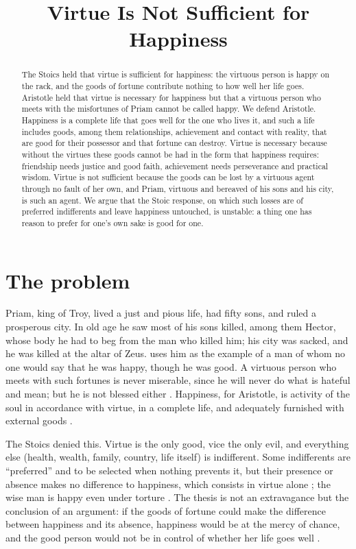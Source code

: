 \documentclass{situationist-preprint}
\title{Virtue Is Not Sufficient for Happiness}
\begin{document}
\maketitle

\begin{abstract}
The Stoics held that virtue is sufficient for happiness: the virtuous person is happy on the rack, and the goods of fortune contribute nothing to how well her life goes. Aristotle held that virtue is necessary for happiness but that a virtuous person who meets with the misfortunes of Priam cannot be called happy. We defend Aristotle. Happiness is a complete life that goes well for the one who lives it, and such a life includes goods, among them relationships, achievement and contact with reality, that are good for their possessor and that fortune can destroy. Virtue is necessary because without the virtues these goods cannot be had in the form that happiness requires: friendship needs justice and good faith, achievement needs perseverance and practical wisdom. Virtue is not sufficient because the goods can be lost by a virtuous agent through no fault of her own, and Priam, virtuous and bereaved of his sons and his city, is such an agent. We argue that the Stoic response, on which such losses are of preferred indifferents and leave happiness untouched, is unstable: a thing one has reason to prefer for one's own sake is good for one.
\end{abstract}

\section{The problem}

Priam, king of Troy, lived a just and pious life, had fifty sons, and ruled a prosperous city. In old age he saw most of his sons killed, among them Hector, whose body he had to beg from the man who killed him; his city was sacked, and he was killed at the altar of Zeus. \citet[I.9, 1100a5--9]{AristotleNE} uses him as the example of a man of whom no one would say that he was happy, though he was good. A virtuous person who meets with such fortunes is never miserable, since he will never do what is hateful and mean; but he is not blessed either \citep[I.10, 1100b33--1101a8]{AristotleNE}. Happiness, for Aristotle, is activity of the soul in accordance with virtue, in a complete life, and adequately furnished with external goods \citep[I.7--8, I.10]{AristotleNE}.

The Stoics denied this. Virtue is the only good, vice the only evil, and everything else (health, wealth, family, country, life itself) is indifferent. Some indifferents are \enquote{preferred} and to be selected when nothing prevents it, but their presence or absence makes no difference to happiness, which consists in virtue alone \citep[III]{CiceroFin}; the wise man is happy even under torture \citep[V]{CiceroTusc}. The thesis is not an extravagance but the conclusion of an argument: if the goods of fortune could make the difference between happiness and its absence, happiness would be at the mercy of chance, and the good person would not be in control of whether her life goes well \citep{LongSedley1987,Annas1993}.
\end{document}
